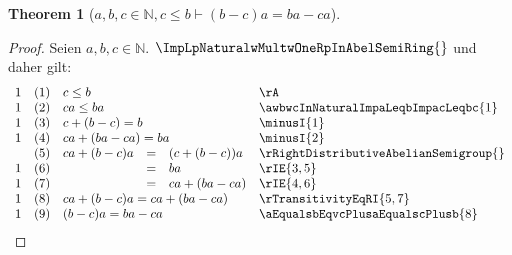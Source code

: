 \documentclass{book}
\theoremstyle{plain}
\newtheorem{theorem}{Theorem}
\theoremstyle{remark}
\theoremstyle{definition}
\begin{document}
\label{awbwcInNaturalwcLeqbImpLpbMinuscRpaEqualsbaMinusca}
\begin{theorem}[\(a,b,c\in\mathbb{N},c\leq b\vdash (b-c)a=ba-ca\)]
\end{theorem}
\begin{proof}
Seien \(a,b,c\in\mathbb{N}\). \(\ImpLpNaturalwMultwOneRpInAbelSemiRing{}\) und daher gilt:
       \[
	\begin{array}{lllcll}
            1       &  (1)  & \multicolumn{3}{l}{c\leq b} & \rA \\
            1       &  (2)  & \multicolumn{3}{l}{ca\leq ba} & \awbwcInNaturalImpaLeqbImpacLeqbc{1} \\
            1       &  (3)  & \multicolumn{3}{l}{c+(b-c)=b} & \minusI{1} \\
            1       &  (4)  & \multicolumn{3}{l}{ca+(ba-ca)=ba} & \minusI{2} \\
                    &  (5)  & ca+(b-c)a&=&(c+(b-c))a & \rRightDistributiveAbelianSemigroup{} \\
            1       &  (6)  &          &=& ba & \rIE{3,5} \\
            1       &  (7)  &          &=& ca+(ba-ca) & \rIE{4,6} \\
            1       &  (8)  & \multicolumn{3}{l}{ca+(b-c)a=ca+(ba-ca)} & \rTransitivityEqRI{5,7} \\
            1       &  (9)  & \multicolumn{3}{l}{(b-c)a=ba-ca} & \aEqualsbEqvcPlusaEqualscPlusb{8} \\
	\end{array}
        \]
\end{proof}
\end{document}
